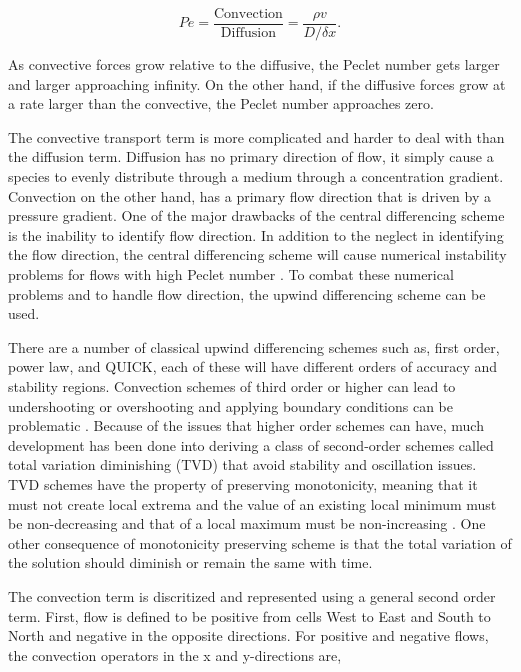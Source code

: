 \begin{equation}
    Pe = \frac{\text{Convection}}{\text{Diffusion}} = \frac{\rho v}{D/\delta x}.
\end{equation}

\noindent As convective forces grow relative to the diffusive, the Peclet number gets larger and larger approaching infinity. On the other hand, if the diffusive forces grow at a rate larger than the convective, the Peclet number approaches zero. 

The convective transport term is more complicated and harder to deal with than the diffusion term. Diffusion has no primary direction of flow, it simply cause a species to evenly distribute through a medium through a concentration gradient. Convection on the other hand, has a primary flow direction that is driven by a pressure gradient. One of the major drawbacks of the central differencing scheme is the inability to identify flow direction. In addition to the neglect in identifying the flow direction, the central differencing scheme will cause numerical instability problems for flows with high Peclet number \cite{versteeg2007}. To combat these numerical problems and to handle flow direction, the upwind differencing scheme can be used. 

There are a number of classical upwind differencing schemes such as, first order, power law, and QUICK, each of these will have different orders of accuracy and stability regions. Convection schemes of third order or higher can lead to undershooting or overshooting and applying boundary conditions can be problematic \cite{versteeg2007}. Because of the issues that higher order schemes can have, much development has been done into deriving a class of second-order schemes called total variation diminishing (TVD) that avoid stability and oscillation issues. TVD schemes have the property of preserving monotonicity, meaning that it must not create local extrema and the value of an existing local minimum must be non-decreasing and that of a local maximum must be non-increasing \cite{versteeg2007}. One other consequence of monotonicity preserving scheme is that the total variation of the solution should diminish or remain the same with time. 

The convection term is discritized and represented using a general second order term. First, flow is defined to be positive from cells West to East and South to North and negative in the opposite directions. For positive and negative flows, the convection operators in the x and y-directions are,

